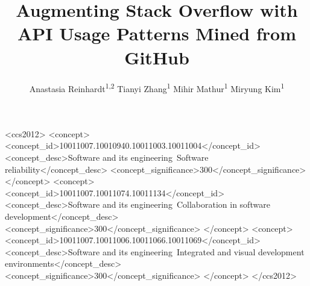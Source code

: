 \documentclass[sigconf, review]{acmart}
\begin{document}
\title{Augmenting Stack Overflow with API Usage Patterns Mined from GitHub}

\author{Anastasia Reinhardt\textsuperscript{1,2}\footnotemark\,\,Tianyi Zhang\textsuperscript{1}\,\,Mihir Mathur\textsuperscript{1}\,\,Miryung Kim\textsuperscript{1}}

\renewcommand{\authors}{Anastasia Reinhart, Tianyi Zhang, Mihir Mathur, and Miryung Kim}
\renewcommand{\shortauthors}{Anastasia Reinhart, Tianyi Zhang, Mihir Mathur, and Miryung Kim}

%
%
%




\begin{CCSXML}
<ccs2012>
<concept>
<concept_id>10011007.10010940.10011003.10011004</concept_id>
<concept_desc>Software and its engineering~Software reliability</concept_desc>
<concept_significance>300</concept_significance>
</concept>
<concept>
<concept_id>10011007.10011074.10011134</concept_id>
<concept_desc>Software and its engineering~Collaboration in software development</concept_desc>
<concept_significance>300</concept_significance>
</concept>
<concept>
<concept_id>10011007.10011006.10011066.10011069</concept_id>
<concept_desc>Software and its engineering~Integrated and visual development environments</concept_desc>
<concept_significance>300</concept_significance>
</concept>
</ccs2012>
\end{CCSXML}

\end{document}
